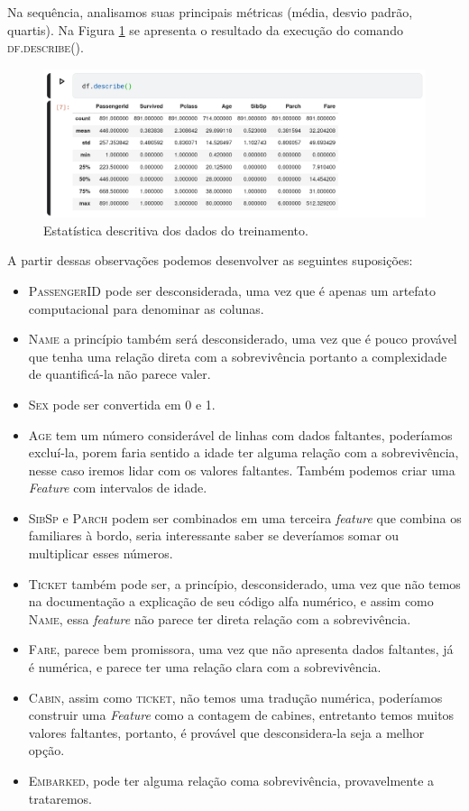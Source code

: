 \documentclass{article}
\begin{document}
Na sequência, analisamos suas principais métricas (média, desvio padrão, quartis). Na Figura \ref{df.describe} se apresenta o resultado da execução do comando \textsc{df.describe()}.
\begin{figure}[H]
\centering
\includegraphics[width=\textwidth]{Figures/df.describe().png}
\caption{\label{df.describe}Estatística descritiva dos dados do treinamento.}
\end{figure}

A partir dessas observações podemos desenvolver as seguintes suposições:
\begin{itemize}
\item \textsc{PassengerID} pode ser desconsiderada, uma vez que é apenas um artefato computacional para denominar as colunas.
\item \textsc{Name} a princípio também será desconsiderado, uma vez que é pouco provável que tenha uma relação direta com a sobrevivência portanto a complexidade de quantificá-la não parece valer. 
\item \textsc{Sex} pode ser convertida em 0 e 1. 
\item \textsc{Age} tem um número considerável de linhas com dados faltantes, poderíamos excluí-la, porem faria sentido a idade ter alguma relação com a sobrevivência, nesse caso iremos lidar com os valores faltantes. Também podemos criar uma \emph{Feature} com intervalos de idade. 
\item \textsc{SibSp} e \textsc{Parch} podem ser combinados em uma terceira \emph{feature} que combina os familiares à bordo, seria interessante saber se deveríamos somar ou multiplicar esses números. 
\item \textsc{Ticket} também pode ser, a princípio, desconsiderado, uma vez que não temos na documentação a explicação de seu código alfa numérico, e assim como \textsc{Name}, essa \emph{feature} não parece ter direta relação com a sobrevivência. 
\item  \textsc{Fare}, parece bem promissora, uma vez que não apresenta dados faltantes, já é numérica, e parece ter uma relação clara com a sobrevivência.  
\item \textsc{Cabin}, assim como \textsc{ticket}, não temos uma tradução numérica, poderíamos construir uma \emph{Feature} como a contagem de cabines, entretanto temos muitos valores faltantes, portanto, é provável que desconsidera-la seja a melhor opção. 
\item \textsc{Embarked}, pode ter alguma relação coma sobrevivência, provavelmente a trataremos. 
\end{itemize}
\end{document}
